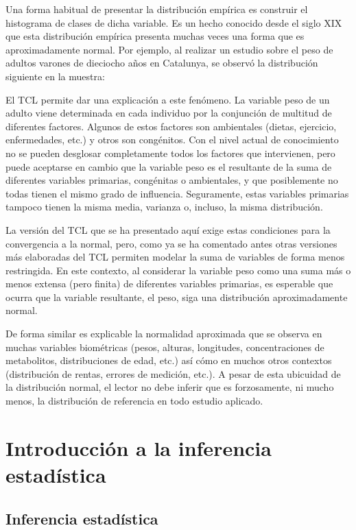\documentclass[
]{article}
\begin{document}
Una forma habitual de presentar la distribución empírica es construir el histograma de clases de dicha variable. Es un hecho conocido desde el siglo XIX que esta distribución empírica presenta muchas veces una forma que es aproximadamente normal. Por ejemplo, al realizar un estudio sobre el peso de adultos varones de dieciocho años en Catalunya, se observó la distribución siguiente en la muestra:

El TCL permite dar una explicación a este fenómeno. La variable peso de un adulto viene determinada en cada individuo por la conjunción de multitud de diferentes factores. Algunos de estos factores son ambientales (dietas, ejercicio, enfermedades, etc.) y otros son congénitos. Con el nivel actual de conocimiento no se pueden desglosar completamente todos los factores que intervienen, pero puede aceptarse en cambio que la variable peso es el resultante de la suma de diferentes variables primarias, congénitas o ambientales, y que posiblemente no todas tienen el mismo grado de influencia. Seguramente, estas variables primarias tampoco tienen la misma media, varianza o, incluso, la misma distribución.

La versión del TCL que se ha presentado aquí exige estas condiciones para la convergencia a la normal, pero, como ya se ha comentado antes otras versiones más elaboradas del TCL permiten modelar la suma de variables de forma menos restringida. En este contexto, al considerar la variable peso como una suma más o menos extensa (pero finita) de diferentes variables primarias, es esperable que ocurra que la variable resultante, el peso, siga una distribución aproximadamente normal.

De forma similar es explicable la normalidad aproximada que se observa en muchas variables biométricas (pesos, alturas, longitudes, concentraciones de metabolitos, distribuciones de edad, etc.) así cómo en muchos otros contextos (distribución de rentas, errores de medición, etc.). A pesar de esta ubicuidad de la distribución normal, el lector no debe inferir que es forzosamente, ni mucho menos, la distribución de referencia en todo estudio aplicado.

\section{Introducción a la inferencia estadística}\label{introducciuxf3n-a-la-inferencia-estaduxedstica}

\subsection{Inferencia estadística}\label{inferencia-estaduxedstica}
\end{document}
